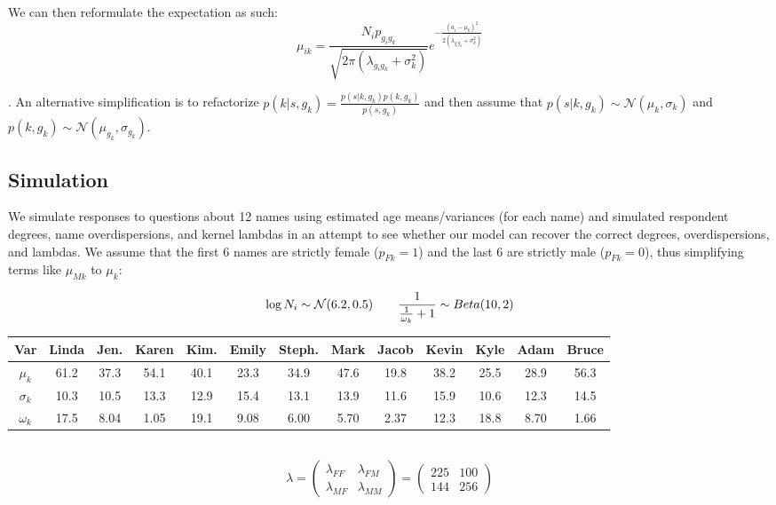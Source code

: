 \documentclass[12pt]{article}
\begin{document}
\noindent We can then reformulate the expectation as such:
$$\mu_{ik} =
\frac{N_i p_{g_ig_k}}{\sqrt{2\pi(\lambda_{g_ig_k} + \sigma_{k}^2)}} e^{-\frac{(a_i-\mu_{k})^2}{2(\lambda_{g_ig_k}+\sigma_{k}^2)}} 
$$

. An alternative simplification is to refactorize $p(k | s, g_k) = \frac{p(s | k, g_k) p(k, g_k)}{p(s, g_k)}$ and then assume that $p(s | k, g_k) \sim \mathcal{N}(\mu_{k}, \sigma_{k})$ and $p(k, g_k) \sim \mathcal{N}(\mu_{g_k}, \sigma_{g_k})$.

\pagebreak
\subsection*{Simulation}
We simulate responses to questions about 12 names using estimated age means/variances (for each name) and simulated respondent degrees, name overdispersions, and kernel lambdas in an attempt to see whether our model can recover the correct degrees, overdispersions, and lambdas. We assume that the first 6 names are strictly female ($p_{Fk} = 1$) and the last 6 are strictly male ($p_{Fk} = 0$), thus simplifying terms like $\mu_{Mk}$ to $\mu_k$:

$$\log N_i \sim \mathcal{N}(6.2,0.5) \hspace{20 pt}  \frac{1}{ \frac{1}{\omega_k}+1} \sim Beta(10,2) 
$$

\noindent \begin{tabular}{c | cccccccccccc} 
Var & Linda & Jen. & Karen & Kim. & Emily & Steph. & Mark & Jacob & Kevin & Kyle & Adam & Bruce \\
\hline
$\mu_k$ & 61.2 & 37.3 & 54.1 & 40.1 & 23.3 & 34.9 & 47.6 & 19.8 & 38.2 & 25.5 & 28.9 & 56.3 \\
$\sigma_k$ & 10.3 & 10.5 & 13.3 & 12.9 & 15.4 & 13.1 & 13.9 & 11.6 & 15.9 & 10.6 & 12.3 & 14.5  \\
$\omega_k$ & 17.5 & 8.04 & 1.05 & 19.1 & 9.08 & 6.00 & 5.70 & 2.37 & 12.3 & 18.8 & 8.70 & 1.66  \\
\end{tabular}\\

$$ \lambda
= \left( \begin{array}{cc} \lambda_{FF} & \lambda_{FM} \\
\lambda_{MF} & \lambda_{MM} \end{array} \right) 
= \left( \begin{array}{cc}
225 & 100 \\
144 & 256 \end{array} \right) $$
\end{document}

